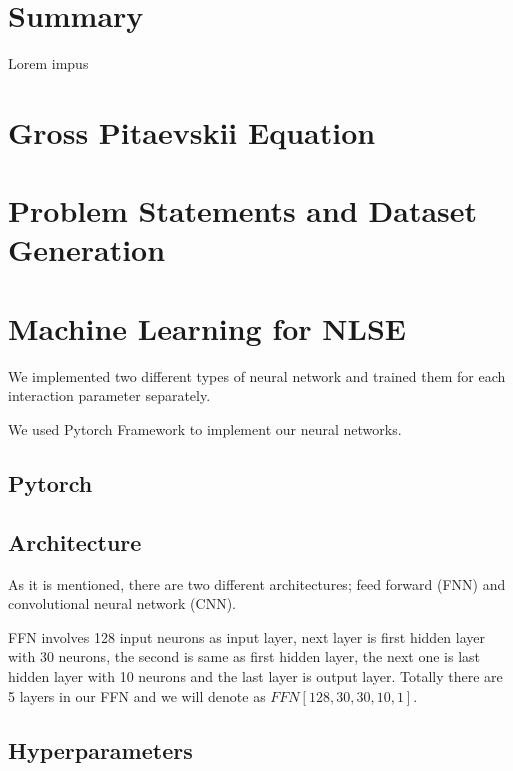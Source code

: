 \documentclass[a4paper,times,12pt]{article}
\title{}%
\date{}
\begin{document}
\setcounter{page}{1}

\section*{Summary}
Lorem impus

\section{Gross Pitaevskii Equation}
\section{Problem Statements and Dataset Generation}
\section{Machine Learning for NLSE}

We implemented two different types of neural network and trained them for each interaction parameter separately.

We used Pytorch Framework to implement our neural networks. 


\subsection{Pytorch}


\subsection{Architecture}

As it is mentioned, there are two different architectures; feed forward (FNN) and convolutional neural network (CNN).  

FFN involves 128 input neurons as input layer, next layer is first hidden layer with 30 neurons, the second is same as first hidden layer, the next one is last hidden layer with 10 neurons and the last layer is output layer. Totally there are 5 layers in our FFN and we will denote as $FFN[128, 30, 30, 10, 1]$. 



\subsection{Hyperparameters}


\newpage
\end{document}
